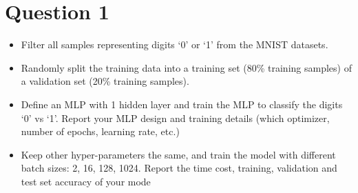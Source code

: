 
\section{Question 1}

\begin{itemize}
    \item  Filter all samples representing digits `0' or `1' from the MNIST datasets.
    
    \item Randomly split the training data into a training set (80\% training samples) of a validation set (20\% training samples). 
    
    \item Define an MLP with 1 hidden layer and train the MLP to classify the digits `0' vs `1'. Report your MLP design and training details (which optimizer, number of epochs, learning rate, etc.) 
    
    \item Keep other hyper-parameters the same, and train the model with different batch sizes: 2, 16, 128, 1024. Report the time cost, training, validation and test set accuracy of your mode
\end{itemize}

